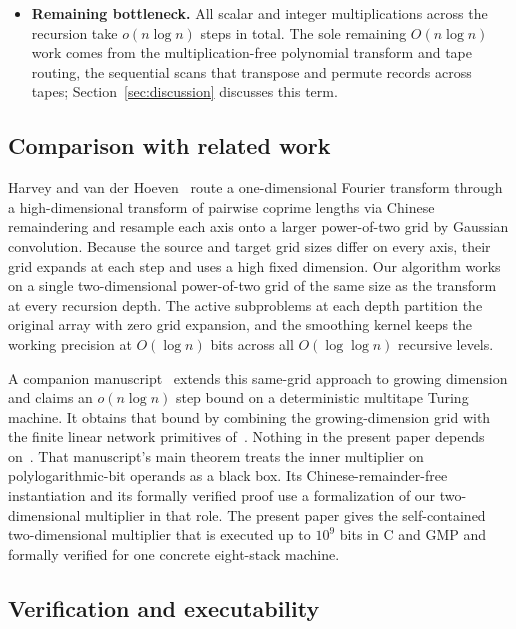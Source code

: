 \begin{itemize}[leftmargin=*,itemsep=2pt,parsep=0pt,topsep=3pt]
  \item \textbf{Remaining bottleneck.} All scalar and integer multiplications across the recursion take $o(n \log n)$ steps in total. The sole remaining $O(n \log n)$ work comes from the multiplication-free polynomial transform and tape routing, the sequential scans that transpose and permute records across tapes; Section~\ref{sec:discussion} discusses this term.
\end{itemize}

\subsection{Comparison with related work}\label{sec:intro-comparison}

Harvey and van der Hoeven~\cite{HvdH21} route a one-dimensional Fourier transform through a high-dimensional transform of pairwise coprime lengths via Chinese remaindering and resample each axis onto a larger power-of-two grid by Gaussian convolution. Because the source and target grid sizes differ on every axis, their grid expands at each step and uses a high fixed dimension. Our algorithm works on a single two-dimensional power-of-two grid of the same size as the transform at every recursion depth. The active subproblems at each depth partition the original array with zero grid expansion, and the smoothing kernel keeps the working precision at $O(\log n)$ bits across all $O(\log \log n)$ recursive levels.

A companion manuscript~\cite{CLW26} extends this same-grid approach to growing dimension and claims an $o(n \log n)$ step bound on a deterministic multitape Turing machine. It obtains that bound by combining the growing-dimension grid with the finite linear network primitives of~\cite{OAI26}. Nothing in the present paper depends on~\cite{CLW26}. That manuscript's main theorem treats the inner multiplier on polylogarithmic-bit operands as a black box. Its Chinese-remainder-free instantiation and its formally verified proof use a formalization of our two-dimensional multiplier in that role. The present paper gives the self-contained two-dimensional multiplier that is executed up to $10^9$ bits in C and GMP and formally verified for one concrete eight-stack machine.

\subsection{Verification and executability}\label{sec:intro-verification}

